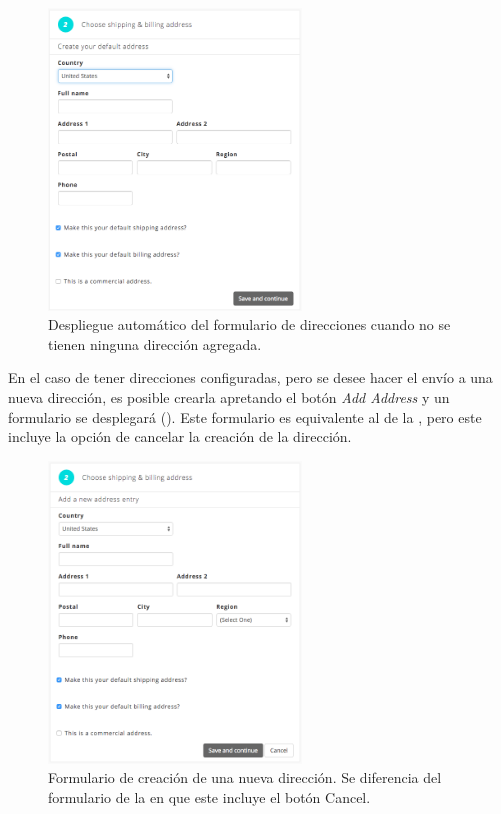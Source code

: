 	\begin{figure}[H]
		\centering
		\includegraphics[width=0.6\textwidth]{figuras/shipping/form_address.png}
		\caption{Despliegue automático del formulario de direcciones cuando no se tienen ninguna dirección agregada.}
		\label{figure:shipping:form_address}
	\end{figure}


	En el caso de tener direcciones configuradas, pero se desee hacer el envío a una nueva dirección, es posible crearla apretando el botón \textit{Add Address} y un formulario se desplegará (). Este formulario es equivalente al de la , pero este incluye la opción de cancelar la creación de la dirección.

	\begin{figure}[H]
		\centering
		\includegraphics[width=0.6\textwidth]{figuras/shipping/form_add_address.png}
		\caption{Formulario de creación de una nueva dirección. Se diferencia del formulario de la  en que este incluye el botón Cancel.}
		\label{figure:shipping:form_add_address}
	\end{figure}